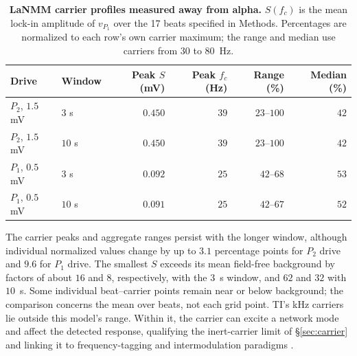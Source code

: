 \documentclass[11pt,a4paper]{article}
\begin{document}
\begin{table}[t!]
\centering\small
\caption{\textbf{LaNMM carrier profiles measured away from alpha.}
$S(f_c)$ is the mean lock-in amplitude of $v_{P_1}$ over the 17 beats specified
in Methods. Percentages are normalized to each row's own carrier maximum;
the range and median use carriers from $30$ to $80$~Hz.}
\label{tab:lanmm-carrier}
\begin{tabular}{@{}llrrrr@{}}
\toprule
Drive & Window & Peak $S$ (mV) & Peak $f_c$ (Hz) & Range (\%) & Median (\%)\\
\midrule
$P_2$, $1.5$ mV & $3$ s  & $0.450$ & $39$ & $23$--$100$ & $42$\\
$P_2$, $1.5$ mV & $10$ s & $0.450$ & $39$ & $23$--$100$ & $42$\\
$P_1$, $0.5$ mV & $3$ s  & $0.092$ & $25$ & $42$--$68$  & $53$\\
$P_1$, $0.5$ mV & $10$ s & $0.091$ & $25$ & $42$--$67$  & $52$\\
\bottomrule
\end{tabular}
\end{table}

The carrier peaks and aggregate ranges persist with the longer window, although
individual normalized values change by up to $3.1$ percentage points for $P_2$
drive and $9.6$ for $P_1$ drive. The smallest $S$ exceeds its mean field-free
background by factors of about $16$ and $8$, respectively, with the $3$~s window,
and $62$ and $32$ with $10$~s. Some individual beat--carrier points remain near or below
background; the comparison concerns the mean over beats, not each grid point.
TI's kHz carriers lie outside this model's range. Within it, the carrier can
excite a network mode and affect the detected response, qualifying the inert-carrier
limit of \S\ref{sec:carrier} and linking it to frequency-tagging and
intermodulation paradigms \cite{gordon2019}.
\end{document}
